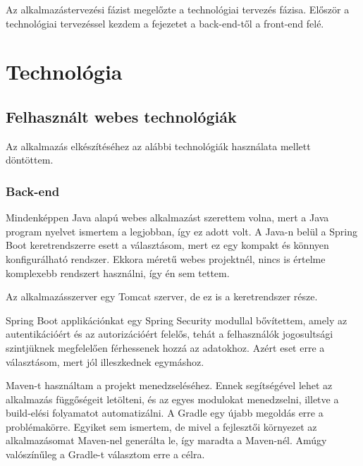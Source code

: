 



Az alkalmazástervezési fázist megelőzte a technológiai tervezés fázisa. Először a technológiai tervezéssel kezdem a fejezetet a back-end-től a front-end felé.

\section{Technológia}

\subsection{Felhasznált webes technológiák}

Az alkalmazás elkészítéséhez az alábbi technológiák használata mellett döntöttem.

\subsubsection{Back-end}
Mindenképpen Java alapú webes alkalmazást szerettem volna, mert a Java program nyelvet ismertem a legjobban, így ez adott volt. A Java-n belül a Spring Boot keretrendszerre esett a választásom, mert ez egy kompakt és könnyen konfigurálható rendszer. Ekkora méretű webes projektnél, nincs is értelme komplexebb rendszert használni, így én sem tettem. 

Az alkalmazásszerver egy Tomcat szerver, de ez is a keretrendszer része. 

Spring Boot applikációnkat egy Spring Security modullal bővítettem, amely az autentikációért és az autorizációért felelős, tehát  a felhasználók jogosultsági szintjüknek megfelelően férhessenek hozzá az adatokhoz. Azért eset erre a választásom, mert jól illeszkednek egymáshoz.

Maven-t használtam a projekt menedzseléséhez. Ennek segítségével lehet az alkalmazás függőségeit letölteni, és az egyes modulokat menedzselni, illetve a build-elési folyamatot automatizálni. A Gradle egy újabb megoldás erre a problémakörre. Egyiket sem ismertem, de mivel a fejlesztői környezet az alkalmazásomat Maven-nel generálta le, így maradta a Maven-nél. Amúgy valószínűleg a Gradle-t választom erre a célra.

